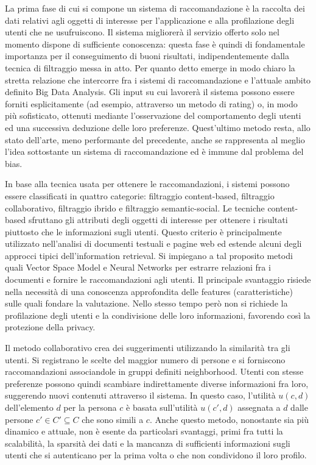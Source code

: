 \documentclass[Lau,binding=0.6cm,noexaminfo,oneside]{sapthesis}
\begin{document}
\medskip

La prima fase di cui si compone un sistema di raccomandazione è la raccolta dei dati relativi agli oggetti di interesse per l'applicazione e alla profilazione degli utenti che ne usufruiscono. Il sistema migliorerà il servizio offerto solo nel momento dispone di sufficiente conoscenza: questa fase è quindi di fondamentale importanza per il conseguimento di buoni risultati, indipendentemente dalla tecnica di filtraggio messa in atto. Per quanto detto emerge in modo chiaro la stretta relazione che intercorre fra i sistemi di raccomandazione e l'attuale ambito definito Big Data Analysis.
Gli input su cui lavorerà il sistema possono essere forniti esplicitamente (ad esempio, attraverso un metodo di rating) o, in modo più sofisticato, ottenuti mediante l'osservazione del comportamento degli utenti ed una successiva deduzione delle loro preferenze. Quest'ultimo metodo resta, allo stato dell'arte, meno performante del precedente, anche se rappresenta al meglio l'idea sottostante un sistema di raccomandazione ed è immune dal problema del bias.\medskip

In base alla tecnica usata per ottenere le raccomandazioni, i sistemi possono essere classificati in quattro categorie: filtraggio content-based, filtraggio collaborativo, filtraggio ibrido e filtraggio semantic-social. Le tecniche content-based sfruttano gli attributi degli oggetti di interesse per ottenere i risultati piuttosto che le informazioni sugli utenti.
Questo criterio è principalmente utilizzato nell'analisi di documenti testuali e pagine web ed estende alcuni degli approcci tipici dell'information retrieval. Si impiegano a tal proposito metodi quali Vector Space Model e Neural Networks per estrarre relazioni fra i documenti e fornire le raccomandazioni agli utenti. Il principale svantaggio risiede nella necessità di una conoscenza approfondita delle features (caratteristiche) sulle quali fondare la valutazione. Nello stesso tempo però non si richiede la profilazione degli utenti e la condivisione delle loro informazioni, favorendo così la protezione della privacy.\medskip

Il metodo collaborativo crea dei suggerimenti utilizzando la similarità tra gli utenti. Si registrano le scelte del maggior numero di persone e si forniscono raccomandazioni associandole in gruppi definiti neighborhood. Utenti con stesse preferenze possono quindi scambiare indirettamente diverse informazioni fra loro, suggerendo nuovi contenuti attraverso il sistema.
In questo caso, l'utilità $u(c,d)$ dell'elemento $d$ per la persona $c$ è basata sull'utilità $u(c',d)$ assegnata a $d$ dalle persone $c' \in C' \subseteq C$ che sono simili a $c$. Anche questo metodo, nonostante sia più dinamico e attuale, non è esente da particolari svantaggi, primi fra tutti la scalabilità, la sparsità dei dati e la mancanza di sufficienti informazioni sugli utenti che si autenticano per la prima volta o che non condividono il loro profilo.\medskip
\end{document}
